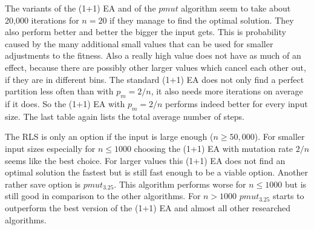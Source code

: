 

The variants of the (1+1) EA and of the $pmut$ algorithm seem to take about 20,000 iterations for $n=20$ if they manage to find the optimal solution.
They also perform better and better the bigger the input gets.
This is probability caused by the many additional small values that can be used for smaller adjustments to the fitness.
Also a really high value does not have as much of an effect, because there are possibly other larger values which cancel each other out, if they are in different bins.
The standard (1+1) EA does not only find a perfect partition less often than with $p_m=2/n$, it also needs more iterations on average if it does.
So the (1+1) EA with $p_m=2/n$ performs indeed better for every input size.
The last table again lists the total average number of steps.


The RLS is only an option if the input is large enough ($n \ge 50,000$). For smaller input sizes especially for $n \le 1000$ choosing the (1+1) EA with mutation rate $2/n$ seems like the best choice. For larger values this (1+1) EA does not find an optimal solution the fastest but is still fast enough to be a viable option. Another rather save option is $pmut_{3.25}$. This algorithm performs worse for $n \le 1000$ but is still good in comparison to the other algorithms. For $n > 1000$ $pmut_{3.25}$ starts to outperform the best version of the (1+1) EA and almost all other researched algorithms.
